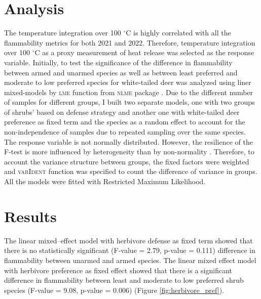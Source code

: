 \documentclass{ttuthes2007}
\newcommand{\pkg}[1]{\textsc{#1}}
\begin{document}
\section{Analysis}
The temperature integration over 100 $^{\circ}$C is highly correlated with all the flammability metrics %
for both 2021 and 2022. Therefore, temperature integration over 100 $^{\circ}$C as a proxy measurement of heat release was selected as the response variable. Initially, to test the significance of the difference in flammability between armed and unarmed species as well as between least preferred and moderate to low preferred species for white-tailed deer was analyzed using liner mixed-models by \pkg{lme} function from \pkg{nlme} package \citep{pinheiro2017package}. Due to the different number of samples for different groups, I  built two separate models, one with two groups of shrubs' based on defense strategy and another one with white-tailed deer preference as fixed term and the species as a random effect to account for the non-independence of samples due to repeated sampling over the same species. The response variable is not normally distributed. However, the resilience of the F-test is more influenced by heterogeneity than by non-normality \citep{blanca2017non}. Therefore, to account the variance structure between groups, the fixed factors were weighted and \pkg{varIdent} function was specified to count the difference of variance in groups. All the models were fitted with Restricted Maximum Likelihood. 


\section{Results}

The linear mixed--effect model with herbivore defense as fixed term showed that there is no statistically significant (F-value = 2.79, p-value = 0.111) difference in flammability between unarmed and armed species. %
The linear mixed effect model with herbivore preference as fixed effect showed that there is a significant difference in flammability between least and moderate to low preferred shrub species (F-value = 9.08, p-value = 0.006)
(Figure \ref{fig:herbivore_pref}). 
\end{document}
